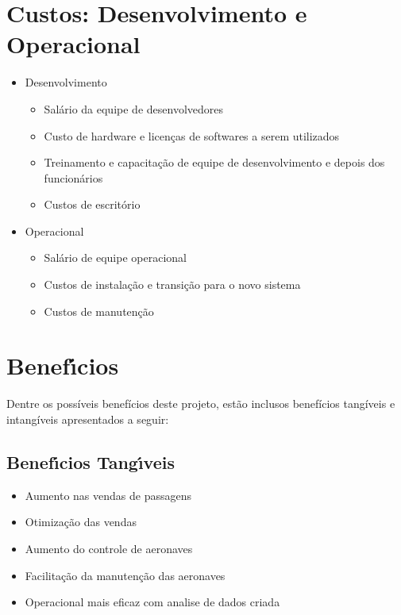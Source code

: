 \section{Custos: Desenvolvimento e Operacional}
\begin{itemize}
       \item Desenvolvimento
             \begin{itemize}
                    \item Salário da equipe de desenvolvedores
                    \item Custo de hardware e licenças de softwares a serem utilizados
                    \item Treinamento e capacitação de equipe de desenvolvimento e depois dos funcionários
                    \item Custos de escritório
             \end{itemize}
       \item Operacional
             \begin{itemize}
                    \item Salário de equipe operacional
                    \item Custos de instalação e transição para o novo sistema
                    \item Custos de manutenção
                          
             \end{itemize}
\end{itemize}

\section{Benef\'{\i}cios}
Dentre os possíveis benefícios deste projeto, estão inclusos benefícios tangíveis e intangíveis
apresentados a seguir:

\subsection{Benef\'{\i}cios Tang\'{\i}veis}
\begin{itemize}
       \item Aumento nas vendas de passagens
       \item Otimização das vendas
       \item Aumento do controle de aeronaves
       \item Facilitação da manutenção das aeronaves
       \item Operacional mais eficaz com analise de dados criada
\end{itemize}



